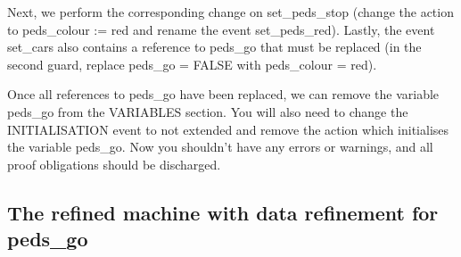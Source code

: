 Next, we perform the corresponding change on \textsf{set\_peds\_stop} (change the action to \textsf{peds\_\-colour := red} and rename the event \textsf{set\_peds\_red}). Lastly, the event \textsf{set\_cars} also contains a reference to \textsf{peds\_go} that must be replaced (in the second guard, replace \textsf{peds\_go = FALSE} with \textsf{peds\_colour = red}).

Once all references to \textsf{peds\_go} have been replaced, we can remove the variable \textsf{peds\_go} from the \textsf{VARIABLES} section. You will also need to change the \textsf{INITIALISATION} event to \textsf{not extended} and remove the action which initialises the variable \textsf{peds\_go}. Now you shouldn't have any errors or warnings, and all proof obligations should be discharged.


\subsection{The refined machine with data refinement for peds\_go}
\label{tut_refined_machine}

